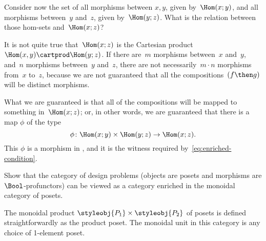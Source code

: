 {\begin{example}
        Consider now the set of all morphisms between $x, y$, given by~$\Hom(x;y)$, and
        all morphisms between~$y$ and~$z$, given by~$\Hom(y; z)$. What is the relation
        between those hom-sets and~$\Hom(x; z)$?

        It is not quite true that~$\Hom(x; z)$ is the Cartesian product~$\Hom(x, y)
        \cartprod \Hom(y; z)$. If there are~$m$ morphisms between~$x$ and~$y$, and~$n$
        morphisms between~$y$ and~$z$, there are not necessarily~$m \cdot n$ morphisms
        from~$x$ to~$z$, because we are not guaranteed that all the compositions~$(f\then g)$
        will be distinct morphisms.

        What we are guaranteed is that all of the compositions will be mapped to something in~$\Hom(x; z)$; or, in other words, we are guaranteed that there
        is a map $\phi$ of the type
        \begin{equation*}
            \phi \colon \Hom(x; y) \times \Hom(y; z) \rightarrow \Hom(x; z).
        \end{equation*}
        This $\phi$ is a morphism in \Set, and it is the witness required by~\cref{eq:enriched-condition}.

    \end{example}
}

\begin{gradedexercise}
    \label{ex:DPIsEnrichedInPos}
    Show that the category of design problems (objects are posets and morphisms are $\Bool$-profunctors) can be viewed as a category enriched in the monoidal category of posets.



    The monoidal product $\styleobj{P_1} \times \styleobj{P_2}$ of posets is defined straightforwardly as the product poset.
    The monoidal unit in this category is any choice of 1-element poset.
\end{gradedexercise}

